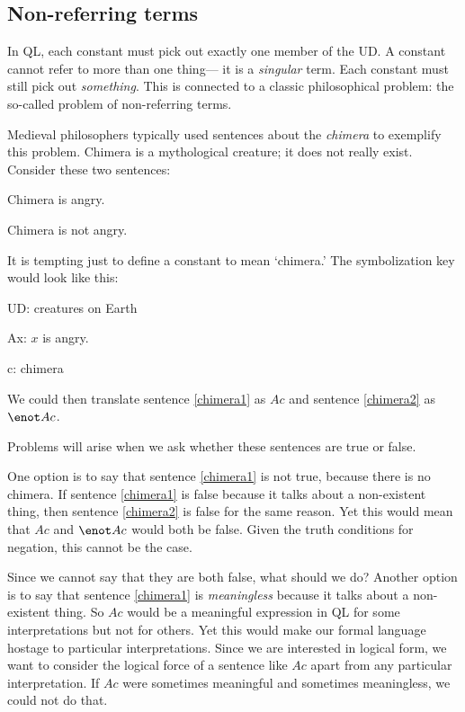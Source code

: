 \subsection{Non-referring terms}
In QL, each constant must pick out exactly one member of the UD. A constant cannot refer to more than one thing--- it is a \emph{singular} term. Each constant must still pick out \emph{something}. This is connected to a classic philosophical problem: the so-called problem of non-referring terms.

Medieval philosophers typically used sentences about the \emph{chimera} to exemplify this problem. Chimera is a mythological creature; it does not really exist. Consider these two sentences:
\begin{earg}
\item[\ex{chimera1}] Chimera is angry.
\item[\ex{chimera2}] Chimera is not angry.
\end{earg}
It is tempting just to define a constant to mean `chimera.' The symbolization key would look like this:
\begin{ekey}
\item[UD:] creatures on Earth
\item[Ax:] $x$ is angry.
\item[c:] chimera
\end{ekey}
We could then translate sentence \ref{chimera1} as $Ac$ and sentence \ref{chimera2} as $\enot Ac$.

Problems will arise when we ask whether these sentences are true or false.

One option is to say that sentence \ref{chimera1} is not true, because there is no chimera. If sentence \ref{chimera1} is false because it talks about a non-existent thing, then sentence \ref{chimera2} is false for the same reason. Yet this would mean that $Ac$ and $\enot Ac$ would both be false. Given the truth conditions for negation, this cannot be the case.

Since we cannot say that they are both false, what should we do? Another option is to say that sentence \ref{chimera1} is \emph{meaningless} because it talks about a non-existent thing. So $Ac$ would be a meaningful expression in QL for some interpretations but not for others. Yet this would make our formal language hostage to particular interpretations. Since we are interested in logical form, we want to consider the logical force of a sentence like $Ac$ apart from any particular interpretation. If $Ac$ were sometimes meaningful and sometimes meaningless, we could not do that.

